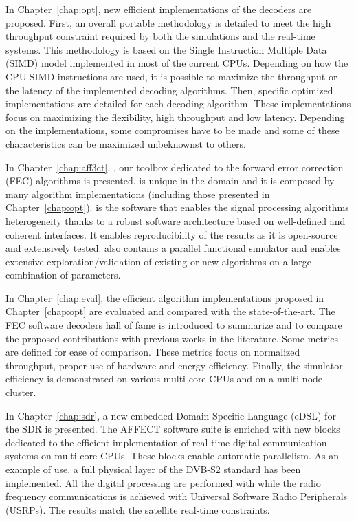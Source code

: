 In Chapter~\ref{chap:opt}, new efficient implementations of the decoders are
proposed. First, an overall portable methodology is detailed to meet the high
throughput constraint required by both the simulations and the real-time
systems. This methodology is based on the Single Instruction Multiple Data
(SIMD) model implemented in most of the current CPUs. Depending on how the CPU
SIMD instructions are used, it is possible to maximize the throughput or the
latency of the implemented decoding algorithms. Then, specific optimized
implementations are detailed for each decoding algorithm. These implementations
focus on maximizing the flexibility, high throughput and low latency. Depending
on the implementations, some compromises have to be made and some of these
characteristics can be maximized unbeknownst to others.

In Chapter~\ref{chap:aff3ct}, \AFFECT, our toolbox dedicated to the forward
error correction (FEC) algorithms is presented. \AFFECT is unique in the domain
and it is composed by many algorithm implementations (including those presented
in Chapter~\ref{chap:opt}). \AFFECT is the software that enables the signal
processing algorithms heterogeneity thanks to a robust software architecture
based on well-defined and coherent interfaces. It enables reproducibility of the
results as it is open-source and extensively tested. \AFFECT also contains a
parallel functional simulator and enables extensive exploration/validation of
existing or new algorithms on a large combination of parameters.

In Chapter~\ref{chap:eval}, the efficient algorithm implementations proposed
in Chapter~\ref{chap:opt} are evaluated and compared with the state-of-the-art.
The FEC software decoders hall of fame is introduced to summarize and to compare
the proposed contributions with previous works in the literature. Some metrics
are defined for ease of comparison. These metrics focus on normalized
throughput, proper use of hardware and energy efficiency. Finally, the \AFFECT
simulator efficiency is demonstrated on various multi-core CPUs and on a
multi-node cluster.

In Chapter~\ref{chap:sdr}, a new embedded Domain Specific Language (eDSL) for
the SDR is presented. The AFFECT software suite is enriched with new blocks
dedicated to the efficient implementation of real-time digital communication
systems on multi-core CPUs. These blocks enable automatic parallelism. As an
example of use, a full physical layer of the DVB-S2 standard has been
implemented. All the digital processing are performed with \AFFECT while the
radio frequency communications is achieved with Universal Software Radio
Peripherals (USRPs). The results match the satellite real-time constraints.
